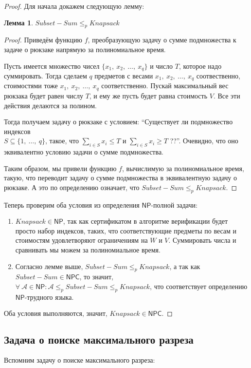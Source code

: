 \documentclass[a4paper,12pt]{article}
\newcommand{\NPclass}{\mathsf{NP}}
\newcommand{\NPCclass}{\mathsf{NPC}}
\newtheorem*{lemma}{Лемма}
\begin{document}
\begin{proof}
    Для начала докажем следующую лемму:
    \begin{lemma}
    $Subset-Sum \leqslant_p Knapsack$
    \end{lemma}
    \begin{proof}
        Приведём функцию $f$, преобразующую задачу о сумме подмножества к задаче о рюкзаке напрямую за полиномиальное время.
        
        Пусть имеется множество чисел $\{x_1,\ x_2,\ \ldots,\ x_q\}$ и число $T$, которое надо суммировать. Тогда сделаем $q$ предметов с весами $x_1,\ x_2,\ \ldots,\ x_q$ соотвественно, стоимостями тоже $x_1,\ x_2,\ \ldots,\ x_q$ соответственно. Пускай максимальный вес рюкзака будет равен числу $T$, и ему же пусть будет равна стоимость $V$. Все эти действия делаются за полином.
        
        Тогда получаем задачу о рюкзаке с условием: ``Существует ли подмножество индексов\\ $S \subseteq \{1,\ \ldots,\ q\}$, такое, что $\sum\limits_{i \in S}x_i \leqslant T$ и $\sum\limits_{i \in S}x_i \geqslant T$ ??''. Очевидно, что оно эквивалентно условию задачи о сумме подмножества.
        
        Таким образом, мы привели функцию $f$, вычислимую за полиномиальное время, такую, что переводит задачу о сумме подмножества в эквивалентную задачу о рюкзаке. А это по определению означает, что $Subset-Sum \leqslant_p Knapsack$.
    \end{proof}
    Теперь проверим оба условия из определения $\NPclass$-полной задачи:
    \begin{enumerate}
        \item $Knapsack \in \NPclass$, так как сертификатом в алгоритме верификации будет просто набор индексов, таких, что соответствующие предметы по весам и стоимостям удовлетворяют ограничениям на $W$ и $V$. Суммировать числа и сравнивать мы можем за полиномиальное время.
        \item Согласно лемме выше, $Subset-Sum \leqslant_p Knapsack$, а так как $Subset-Sum \in \NPCclass$, то значит, $\forall\ \mathscr{A} \in \NPclass: \mathscr{A} \leqslant_p Subset-Sum \leqslant_p Knapsack$, что соответствует определению $\NPclass$-трудного языка.
    \end{enumerate}
    Оба условия выполняются, значит, $Knapsack \in \NPCclass$.
\end{proof}

\subsection{Задача о поиске максимального разреза}
Вспомним задачу о поиске максимального разреза:
\end{document}
